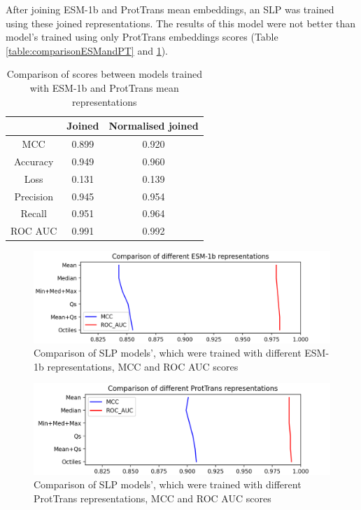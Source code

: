 \documentclass[12pt]{article}
\begin{document}
	After joining ESM-1b and ProtTrans mean embeddings, an SLP was trained 
	using these joined representations. The results of this model were not 
	better than model's trained using only ProtTrans embeddings scores
	(Table \ref{table:comparisonESMandPT} and 
	\ref{table:comparisonJoinedAndJoinedNorm}). 

	\begin{table}[h!]
		\caption{Comparison of scores between models trained with ESM-1b
		and ProtTrans mean representations}
		\vspace{0.2cm}
		\centering
		\begin{tabular}{ | c | c c | }
			\hline 
						
			& Joined & Normalised joined \\
			\hline 
			MCC & 0.899 & 0.920 \\
			Accuracy & 0.949 & 0.960 \\
			Loss & 0.131 & 0.139 \\
			Precision & 0.945 & 0.954 \\
			Recall & 0.951 & 0.964 \\
			ROC AUC & 0.991 & 0.992 \\
			\hline    
		\end{tabular}
		\label{table:comparisonJoinedAndJoinedNorm}
	\end{table}


	\begin{figure}[h!]
		\centering
		\includegraphics[scale=0.7]{SLP_ESM_003_diff_representations.png}

		\caption{Comparison of SLP models', which were trained with different
		ESM-1b representations, MCC and ROC AUC scores}
		\label{figure:scoresRepresentationsESM}
	\end{figure}

	\begin{figure}[h!]
		\centering
		\includegraphics[scale=0.7]{SLP_PT_003_diff_representations.png}

		\caption{Comparison of SLP models', which were trained with different
		ProtTrans representations, MCC and ROC AUC scores}
		\label{figure:scoresRepresentationsPT}
	\end{figure}
\end{document}
